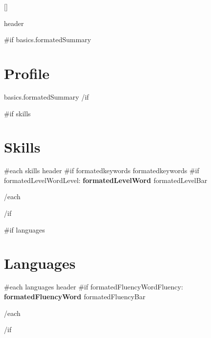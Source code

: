 \documentclass{article}
\begin{document}
\color{primary-950}
\titleformat{\section}{\color{accent}\raggedright\normalsize\bfseries\uppercase}{}{0ex}{}[{\titlerule[0.8pt]}]

{{ header }}

{{#if basics.formatedSummary}}\section*{Profile} {
  {{ basics.formatedSummary }}
}{{/if}}

{{#if skills}}\section*{Skills}{
  {{#each skills}}
    {{ header }}\newline
    {{#if formatedkeywords}}{{ formatedkeywords }}
    {{#if formatedLevelWord}}Level: {\bfseries {{ formatedLevelWord }} }{{ formatedLevelBar }} 
    \par
  {{/each}}
}{{/if}}

{{#if languages}}\section*{Languages}{
  {{#each languages}}
    {{ header }}\newline
    {{#if formatedFluencyWord}}Fluency: {\bfseries {{ formatedFluencyWord }} }{{ formatedFluencyBar }} 
    \par
  {{/each}}
}{{/if}}
\end{document}
